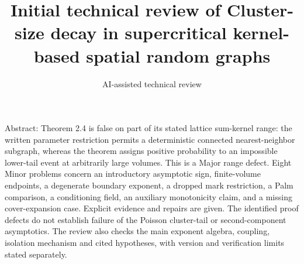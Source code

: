 \documentclass[10pt]{article}
\title{Initial technical review of
Cluster-size decay in supercritical
kernel-based spatial random graphs}
\author{AI-assisted technical review}
\date{}
\begin{document}
\maketitle
Abstract: Theorem 2.4 is false on part of its stated lattice sum-kernel range: the written parameter restriction permits a deterministic connected nearest-neighbor subgraph, whereas the theorem assigns positive probability to an impossible lower-tail event at arbitrarily large volumes. This is a Major range defect. Eight Minor problems concern an introductory asymptotic sign, finite-volume endpoints, a degenerate boundary exponent, a dropped mark restriction, a Palm comparison, a conditioning field, an auxiliary monotonicity claim, and a missing cover-expansion case. Explicit evidence and repairs are given. The identified proof defects do not establish failure of the Poisson cluster-tail or second-component asymptotics. The review also checks the main exponent algebra, coupling, isolation mechanism and cited hypotheses, with version and verification limits stated separately.\par
\end{document}
